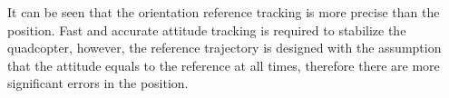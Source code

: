  It can be seen that the orientation reference tracking is more precise than the position. Fast and accurate attitude tracking is required to stabilize the quadcopter, however, the reference trajectory is designed with the assumption that the attitude equals to the reference at all times, therefore there are more significant errors in the position.
 
 
